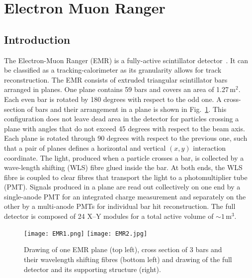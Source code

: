\graphicspath{{05-EMR/Figures/}}

\section{Electron Muon Ranger}
\label{Sect:EMR}

\subsection{Introduction}
\label{SubSect:EMR_Intro}

The Electron-Muon Ranger (EMR) is a fully-active scintillator detector~\cite{2016JInst..11T10007}. It can be classified as a tracking-calorimeter as its granularity allows for track reconstruction. The EMR consists of extruded triangular scintillator bars arranged in planes. One plane contains 59 bars and covers an area of 1.27\,m$^2$. Each even bar is rotated by 180 degrees with respect to the odd one. A cross-section of bars and their arrangement in a plane is shown in Fig.~\ref{fig:EMR}. This configuration does not leave dead area in the detector for particles crossing a plane with angles that do not exceed 45 degrees with respect to the beam axis. Each plane is rotated through 90 degrees with respect to the previous one, such that a pair of planes defines a horizontal and vertical $(x, y)$ interaction coordinate. The light, produced when a particle crosses a bar, is collected by a wave-length shifting (WLS) fibre glued inside the bar. At both ends, the WLS fibre is coupled to clear fibres that transport the light to a photomultiplier tube (PMT). Signals produced in a plane are read out collectively on one end by a single-anode PMT for an integrated charge measurement and separately on the other by a multi-anode PMTs for individual bar hit reconstruction. The full detector is composed of 24 X--Y modules for a total active volume of $\sim 1$\,m$^3$.

\begin{figure}[htb!]
	\begin{center}
		\texttt{[image: EMR1.png]}
		\hfill
		\texttt{[image: EMR2.jpg]}
		\caption{Drawing of one EMR plane (top left), cross section of 3 bars and their wavelength shifting fibres (bottom left) and drawing of the full detector and its supporting structure (right).}
		\label{fig:EMR}
	\end{center}
\end{figure}

